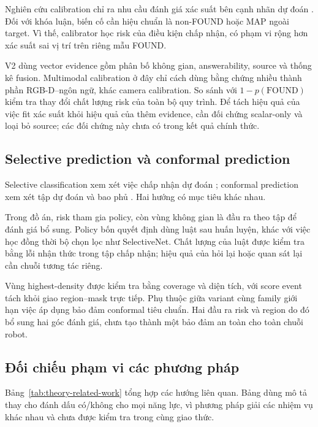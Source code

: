 Nghiên cứu calibration chỉ ra nhu cầu đánh giá xác suất bên cạnh nhãn dự đoán \cite{guo2017calibration,niculescu2005probabilities}. Đối với khóa luận, biến cố cần hiệu chuẩn là non-FOUND hoặc MAP ngoài target. Vì thế, calibrator học risk của điều kiện chấp nhận, có phạm vi rộng hơn xác suất sai vị trí trên riêng mẫu FOUND.

V2 dùng vector evidence gồm phân bố không gian, answerability, source và thống kê fusion. Multimodal calibration ở đây chỉ cách dùng bằng chứng nhiều thành phần RGB-D--ngôn ngữ, khác camera calibration. So sánh với $1-p(\mathrm{FOUND})$ kiểm tra thay đổi chất lượng risk của toàn bộ quy trình. Để tách hiệu quả của việc fit xác suất khỏi hiệu quả của thêm evidence, cần đối chứng scalar-only và loại bỏ source; các đối chứng này chưa có trong kết quả chính thức.

\subsection{Selective prediction và conformal prediction}

Selective classification xem xét việc chấp nhận dự đoán \cite{geifman2017selective,geifman2019selectivenet}; conformal prediction xem xét tập dự đoán và bao phủ \cite{angelopoulos2021conformal,lei2018distributionfree}. Hai hướng có mục tiêu khác nhau.

Trong đồ án, risk tham gia policy, còn vùng không gian là đầu ra theo tập để đánh giá bổ sung. Policy bốn quyết định dùng luật sau huấn luyện, khác với việc học đồng thời bộ chọn lọc như SelectiveNet. Chất lượng của luật được kiểm tra bằng lỗi nhận thức trong tập chấp nhận; hiệu quả của hỏi lại hoặc quan sát lại cần chuỗi tương tác riêng.

Vùng highest-density được kiểm tra bằng coverage và diện tích, với score event tách khỏi giao region--mask trực tiếp. Phụ thuộc giữa variant cùng family giới hạn việc áp dụng bảo đảm conformal tiêu chuẩn. Hai đầu ra risk và region do đó bổ sung hai góc đánh giá, chưa tạo thành một bảo đảm an toàn cho toàn chuỗi robot.

\subsection{Đối chiếu phạm vi các phương pháp}

Bảng~\ref{tab:theory-related-work} tổng hợp các hướng liên quan. Bảng dùng mô tả thay cho đánh dấu có/không cho mọi năng lực, vì phương pháp giải các nhiệm vụ khác nhau và chưa được kiểm tra trong cùng giao thức.

